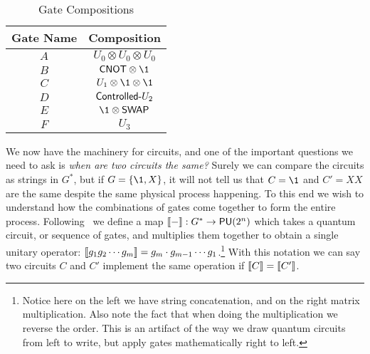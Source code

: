 \begin{table}[ht]
    \centering\begin{tabular}{cc}
        Gate Name & Composition                   \\ \toprule
        $A$       & $U_0 \otimes U_0 \otimes U_0$ \\
        $B$       & $\CNOT \otimes \1$            \\
        $C$       & $U_1 \otimes \1 \otimes \1$   \\
        $D$       & $\mathsf{Controlled}\text{-}U_2$            \\
        $E$       & $\1 \otimes \SWAP$            \\
        $F$       & $U_3$                         \\
    \end{tabular}
    \caption{Gate Compositions}\label{tab:gates2circuit}
\end{table}

We now have the machinery for circuits, and one of the important questions we need to ask is \emph{when are two circuits the same?}
Surely we can compare the circuits as strings in $G^*$, but if $G = \qty{\1, X}$, it will not tell us that $C = \1$ and $C' = XX$ are the same despite the same physical process happening.
To this end we wish to understand how the combinations of gates come together to form the entire process.
Following~\cite{formalcircuit} we define a map $\llbracket-\rrbracket: G^* \to \mathsf{PU} (2^n)$ which takes a quantum circuit, or sequence of gates, and multiplies them together to obtain a single unitary operator: $\llbracket g_1g_2\cdots g_m\rrbracket = g_m\cdot g_{m-1} \cdots g_1$.\footnote{Notice here on the left we have string concatenation, and on the right matrix multiplication. Also note the fact that when doing the multiplication we reverse the order. This is an artifact of the way we draw quantum circuits from left to write, but apply gates mathematically right to left.}
With this notation we can say two circuits $C$ and $C'$ implement the same operation if $\llbracket C\rrbracket = \llbracket C'\rrbracket$.

